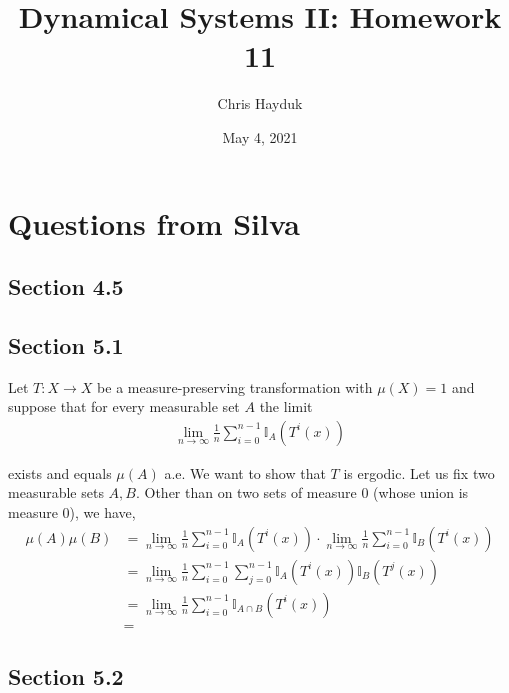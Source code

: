 \documentclass[12pt]{article}
\newenvironment{problem}[2][Problem]{\begin{trivlist}
\item[\hskip \labelsep {\bfseries #1}\hskip \labelsep {\bfseries #2.}]}{\end{trivlist}}
\begin{document}
\title{Dynamical Systems II: Homework 11}

\author{Chris Hayduk}
\date{May 4, 2021}

\maketitle

\section{Questions from Silva}

\subsection{Section 4.5}

\begin{problem}{2}
\end{problem}

\begin{problem}{3}
\end{problem}

\subsection{Section 5.1}

\begin{problem}{2}
\end{problem}

Let $T: X \to X$ be a measure-preserving transformation with $\mu(X) = 1$ and suppose that for every measurable set $A$ the limit
\begin{align*}
\lim_{n \to \infty} \frac{1}{n} \sum_{i=0}^{n-1} \mathbb{I}_A(T^i(x))
\end{align*}

exists and equals $\mu(A)$ a.e. We want to show that $T$ is ergodic. Let us fix two measurable sets $A, B$. Other than on two sets of measure $0$ (whose union is measure $0$), we have,
\begin{align*}
\mu(A) \mu(B) &= \lim_{n \to \infty} \frac{1}{n} \sum_{i=0}^{n-1} \mathbb{I}_A(T^i(x)) \cdot \lim_{n \to \infty} \frac{1}{n} \sum_{i=0}^{n-1} \mathbb{I}_B(T^i(x))\\
&=  \lim_{n \to \infty} \frac{1}{n} \sum_{i=0}^{n-1} \sum_{j=0}^{n-1}  \mathbb{I}_A(T^i(x)) \mathbb{I}_B(T^j(x))\\
&= \lim_{n \to \infty} \frac{1}{n} \sum_{i=0}^{n-1} \mathbb{I}_{A \cap B}(T^i(x))\\
&= 
\end{align*}

\begin{problem}{3}
\end{problem}

\subsection{Section 5.2}

\begin{problem}{2}
\end{problem}

\begin{problem}{4}
\end{problem}

\begin{problem}{5}
\end{problem}
\end{document}
